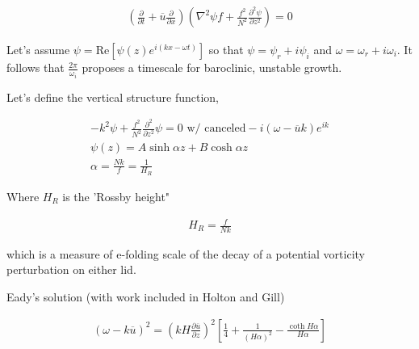 \documentclass[a4paper,12pt]{article}
\begin{document}
\begin{align*}
(\frac{\partial}{\partial t} + \overline{u} \frac{\partial}{\partial x})(\nabla^2 \psi f + \frac{f^2}{N^2}\frac{\partial^2\psi}{\partial z^2}) = 0
\end{align*}

Let's assume $\psi = \text{Re}\left[\psi(z)e^{i(kx-\omega t)}\right]$ so that $\psi = \psi_r + i\psi_i$ and $\omega = \omega_r + i\omega_i$. It follows that $\frac{2\pi}{\omega_i}$ proposes a timescale for baroclinic, unstable growth.

 Let's define the vertical structure function,

\begin{align*}
-k^2 \psi + \frac{f^2}{N^2}\frac{\partial^2}{\partial z^2} \psi = 0 \text{ w/ canceled} -i(\omega - \overline{u}k)e^{ik}\\
\psi(z) = A\sinh{\alpha z} + B \cosh{\alpha z}\\
\alpha = \frac{Nk}{f} = \frac{1}{H_R}
\end{align*}

Where $H_R$ is the 'Rossby height"

\begin{align*}
\boxed{H_R = \frac{f}{Nk}}
\end{align*}

which is a measure of e-folding scale of the decay of a potential vorticity perturbation on either lid. 

Eady's solution (with work included in Holton and Gill)

\begin{align*}
(\omega - k\overline{u})^2 = (kH\frac{\partial \overline{u}}{\partial z})^2\left[\frac{1}{4} + \frac{1}{(H\alpha)^2} - \frac{\coth{H\alpha}}{H\alpha}\right]
\end{align*}
\end{document}
